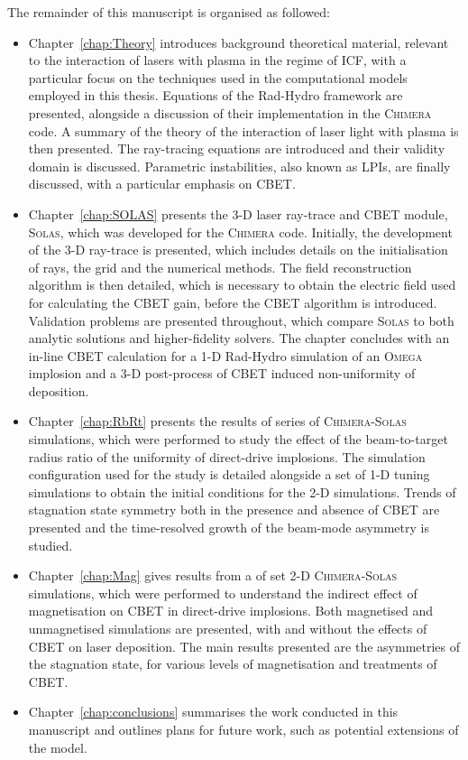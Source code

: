 The remainder of this manuscript is organised as followed:
\begin{itemize}
    \item Chapter~\ref{chap:Theory} introduces background theoretical material, relevant to the interaction of lasers with plasma in the regime of \ac{ICF}, with a particular focus on the techniques used in the computational models employed in this thesis.
    Equations of the \ac{Rad-Hydro} framework are presented, alongside a discussion of their implementation in the \textsc{Chimera} code.
    A summary of the theory of the interaction of laser light with plasma is then presented.
    The ray-tracing equations are introduced and their validity domain is discussed.
    Parametric instabilities, also known as \ac{LPIs}, are finally discussed, with a particular emphasis on \ac{CBET}.
    
    \item Chapter~\ref{chap:SOLAS} presents the 3-D laser ray-trace and \ac{CBET} module, \textsc{Solas}, which was developed for the \textsc{Chimera} code.
    Initially, the development of the 3-D ray-trace is presented, which includes details on the initialisation of rays, the grid and the numerical methods.
    The field reconstruction algorithm is then detailed, which is necessary to obtain the electric field used for calculating the \ac{CBET} gain, before the \ac{CBET} algorithm is introduced.
    Validation problems are presented throughout, which compare \textsc{Solas} to both analytic solutions and higher-fidelity solvers.
    The chapter concludes with an in-line \ac{CBET} calculation for a 1-D \ac{Rad-Hydro} simulation of an \textsc{Omega} implosion and a 3-D post-process of \ac{CBET} induced non-uniformity of deposition.
    
    \item Chapter~\ref{chap:RbRt} presents the results of series of \textsc{Chimera}-\textsc{Solas} simulations, which were performed to study the effect of the beam-to-target radius ratio of the uniformity of direct-drive implosions.
    The simulation configuration used for the study is detailed alongside a set of 1-D tuning simulations to obtain the initial conditions for the 2-D simulations.
    Trends of stagnation state symmetry both in the presence and absence of \ac{CBET} are presented and the time-resolved growth of the beam-mode asymmetry is studied.
    
    \item Chapter~\ref{chap:Mag} gives results from a of set 2-D \textsc{Chimera}-\textsc{Solas} simulations, which were performed to understand the indirect effect of magnetisation on \ac{CBET} in direct-drive implosions.
    Both magnetised and unmagnetised simulations are presented, with and without the effects of \ac{CBET} on laser deposition.
    The main results presented are the asymmetries of the stagnation state, for various levels of magnetisation and treatments of \ac{CBET}.
    
    \item Chapter~\ref{chap:conclusions} summarises the work conducted in this manuscript and outlines plans for future work, such as potential extensions of the model.
    
\end{itemize}
